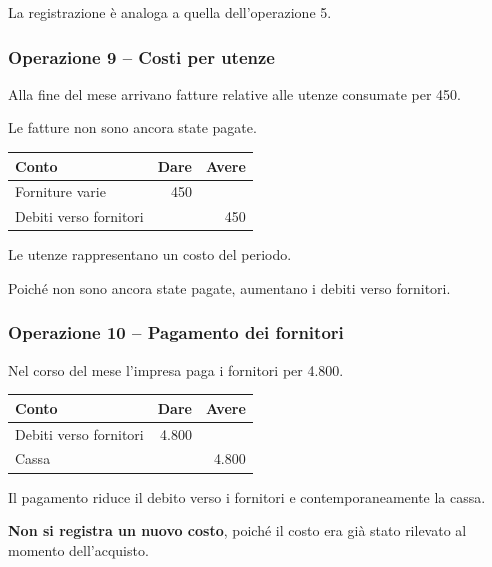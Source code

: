 \noindent La registrazione è analoga
a quella dell'operazione 5.


\subsubsection*{Operazione 9 -- Costi per utenze}

\noindent Alla fine del mese arrivano fatture
relative alle utenze consumate per 450.

\medskip

\noindent Le fatture non sono ancora state pagate.

\begin{center}
\begin{tabular}{|l|r|r|}
\hline
\textbf{Conto} & \textbf{Dare} & \textbf{Avere} \\
\hline
Forniture varie & 450 & \\
\hline
Debiti verso fornitori & & 450 \\
\hline
\end{tabular}
\end{center}

\noindent Le utenze rappresentano
un costo del periodo.

\medskip

\noindent Poiché non sono ancora state pagate,
aumentano i debiti verso fornitori.


\subsubsection*{Operazione 10 -- Pagamento dei fornitori}

\noindent Nel corso del mese l'impresa
paga i fornitori per 4.800.

\begin{center}
\begin{tabular}{|l|r|r|}
\hline
\textbf{Conto} & \textbf{Dare} & \textbf{Avere} \\
\hline
Debiti verso fornitori & 4.800 & \\
\hline
Cassa & & 4.800 \\
\hline
\end{tabular}
\end{center}

\noindent Il pagamento riduce il debito
verso i fornitori e contemporaneamente la cassa.

\medskip

\noindent \textbf{Non si registra un nuovo costo},
poiché il costo era già stato rilevato
al momento dell'acquisto.


